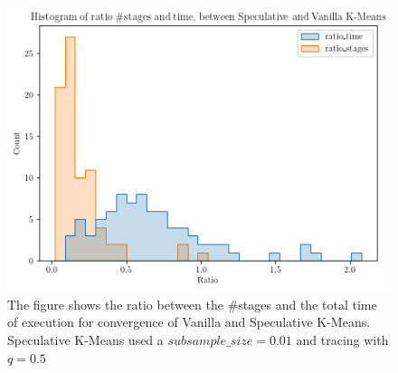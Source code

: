 \begin{figure}[h]
\centering
\includegraphics[width=\linewidth]{./plots/histogram_time_execution.png}
\caption{The figure shows the ratio between the \#stages and the total time of execution for convergence of Vanilla and Speculative K-Means. Speculative K-Means used a $subsample\_size=0.01$ and tracing with $q = 0.5$}
\label{fig:histogram_time_execution}
\end{figure}
